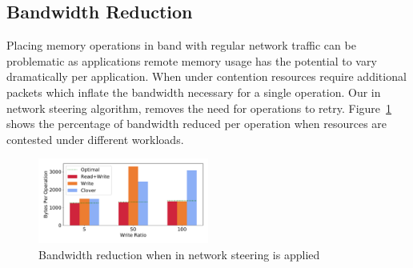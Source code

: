 


\subsection{Bandwidth Reduction}

Placing memory operations in band with regular network traffic can be
problematic as applications remote memory usage has the potential to vary
dramatically per application. When under contention resources require additional
packets which inflate the bandwidth necessary for a single operation. Our in
network steering algorithm, removes the need for operations to retry.
Figure~\ref{fig:bandwidth_reduction} shows the percentage of bandwidth reduced
per operation when resources are contested under different workloads.

\begin{figure}
    \includegraphics[width=0.5\textwidth]{fig/bandwidth_reduction.pdf}
    \caption{{Bandwidth reduction when in network steering is applied}}
    \label{fig:bandwidth_reduction}
\end{figure}

